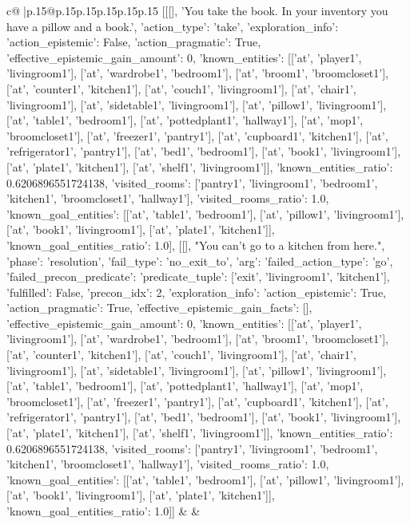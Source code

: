\documentclass{article}
\begin{document}
{\begin{supertabular}{c@{$\;$}|p{.15\linewidth}@{}p{.15\linewidth}p{.15\linewidth}p{.15\linewidth}p{.15\linewidth}p{.15\linewidth}}
{{{	 [[[], 'You take the book. In your inventory you have a pillow and a book.', {'action_type': 'take', 'exploration_info': {'action_epistemic': False, 'action_pragmatic': True, 'effective_epistemic_gain_amount': 0, 'known_entities': [['at', 'player1', 'livingroom1'], ['at', 'wardrobe1', 'bedroom1'], ['at', 'broom1', 'broomcloset1'], ['at', 'counter1', 'kitchen1'], ['at', 'couch1', 'livingroom1'], ['at', 'chair1', 'livingroom1'], ['at', 'sidetable1', 'livingroom1'], ['at', 'pillow1', 'livingroom1'], ['at', 'table1', 'bedroom1'], ['at', 'pottedplant1', 'hallway1'], ['at', 'mop1', 'broomcloset1'], ['at', 'freezer1', 'pantry1'], ['at', 'cupboard1', 'kitchen1'], ['at', 'refrigerator1', 'pantry1'], ['at', 'bed1', 'bedroom1'], ['at', 'book1', 'livingroom1'], ['at', 'plate1', 'kitchen1'], ['at', 'shelf1', 'livingroom1']], 'known_entities_ratio': 0.6206896551724138, 'visited_rooms': ['pantry1', 'livingroom1', 'bedroom1', 'kitchen1', 'broomcloset1', 'hallway1'], 'visited_rooms_ratio': 1.0, 'known_goal_entities': [['at', 'table1', 'bedroom1'], ['at', 'pillow1', 'livingroom1'], ['at', 'book1', 'livingroom1'], ['at', 'plate1', 'kitchen1']], 'known_goal_entities_ratio': 1.0}}], [[], "You can't go to a kitchen from here.", {'phase': 'resolution', 'fail_type': 'no_exit_to', 'arg': {'failed_action_type': 'go', 'failed_precon_predicate': {'predicate_tuple': ['exit', 'livingroom1', 'kitchen1'], 'fulfilled': False, 'precon_idx': 2}}, 'exploration_info': {'action_epistemic': True, 'action_pragmatic': True, 'effective_epistemic_gain_facts': [], 'effective_epistemic_gain_amount': 0, 'known_entities': [['at', 'player1', 'livingroom1'], ['at', 'wardrobe1', 'bedroom1'], ['at', 'broom1', 'broomcloset1'], ['at', 'counter1', 'kitchen1'], ['at', 'couch1', 'livingroom1'], ['at', 'chair1', 'livingroom1'], ['at', 'sidetable1', 'livingroom1'], ['at', 'pillow1', 'livingroom1'], ['at', 'table1', 'bedroom1'], ['at', 'pottedplant1', 'hallway1'], ['at', 'mop1', 'broomcloset1'], ['at', 'freezer1', 'pantry1'], ['at', 'cupboard1', 'kitchen1'], ['at', 'refrigerator1', 'pantry1'], ['at', 'bed1', 'bedroom1'], ['at', 'book1', 'livingroom1'], ['at', 'plate1', 'kitchen1'], ['at', 'shelf1', 'livingroom1']], 'known_entities_ratio': 0.6206896551724138, 'visited_rooms': ['pantry1', 'livingroom1', 'bedroom1', 'kitchen1', 'broomcloset1', 'hallway1'], 'visited_rooms_ratio': 1.0, 'known_goal_entities': [['at', 'table1', 'bedroom1'], ['at', 'pillow1', 'livingroom1'], ['at', 'book1', 'livingroom1'], ['at', 'plate1', 'kitchen1']], 'known_goal_entities_ratio': 1.0}}]] 
	  } 
	   } 
	   } 
	 & & \\ 
 


\end{supertabular}}
\end{document}

